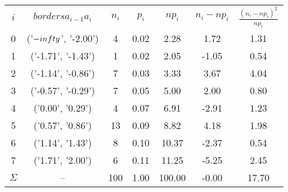 \begin{table}[H]
    \centering
    \begin{tabular}{c|c|c|c|c|c|c}
        $i$ & $borders a_{i-1} a_{i}$ & $n_i$ & $p_i$ & $np_i$ & $n_i - np_i$ & $\frac{(n_i - np_i)^2}{np_i}$ \\
        0 & ('$-\\infty$', '-2.00') & 4 & 0.02 & 2.28 & 1.72 & 1.31 \\
        1 & ('-1.71', '-1.43') & 1 & 0.02 & 2.05 & -1.05 & 0.54 \\
        2 & ('-1.14', '-0.86') & 7 & 0.03 & 3.33 & 3.67 & 4.04 \\
        3 & ('-0.57', '-0.29') & 7 & 0.05 & 5.00 & 2.00 & 0.80 \\
        4 & ('0.00', '0.29') & 4 & 0.07 & 6.91 & -2.91 & 1.23 \\
        5 & ('0.57', '0.86') & 13 & 0.09 & 8.82 & 4.18 & 1.98 \\
        6 & ('1.14', '1.43') & 8 & 0.10 & 10.37 & -2.37 & 0.54 \\
        7 & ('1.71', '2.00') & 6 & 0.11 & 11.25 & -5.25 & 2.45 \\
        $\Sigma$ & -- & 100 & 1.00 & 100.00 & -0.00 & 17.70 
    \end{tabular}
    \caption{}
    \label{}
\end{table}